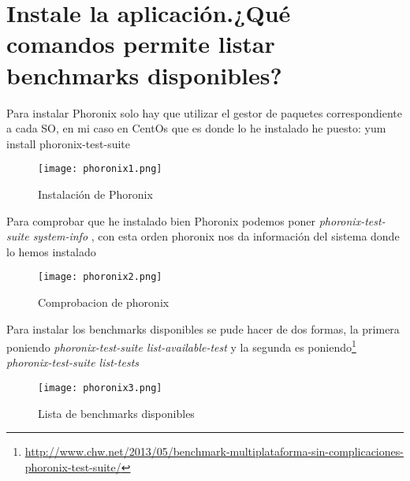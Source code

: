\section{Instale la aplicación.¿Qué comandos permite listar benchmarks disponibles?}
Para instalar Phoronix solo hay que utilizar el gestor de paquetes correspondiente a cada SO, en mi caso en CentOs que es donde lo he instalado he puesto: yum install phoronix-test-suite
\begin{figure}[H] 
\centering
\texttt{[image: phoronix1.png]}  
\label{figura1:}
\caption{Instalación de Phoronix}
\end{figure}
Para comprobar que he instalado bien Phoronix podemos poner \textit{phoronix-test-suite system-info }, con esta orden phoronix nos da información del sistema donde lo hemos instalado
\begin{figure}[H] 
\centering
\texttt{[image: phoronix2.png]}  
\label{figura2:}
\caption{Comprobacion de phoronix}
\end{figure}
Para instalar los benchmarks disponibles se pude hacer de dos formas, la primera poniendo \textit{phoronix-test-suite list-available-test} y la segunda es poniendo\footnote{\url{http://www.chw.net/2013/05/benchmark-multiplataforma-sin-complicaciones-phoronix-test-suite/}} \textit{phoronix-test-suite list-tests}
\begin{figure}[H] 
\centering
\texttt{[image: phoronix3.png]}  
\label{figura3:}
\caption{Lista de benchmarks disponibles}
\end{figure}
